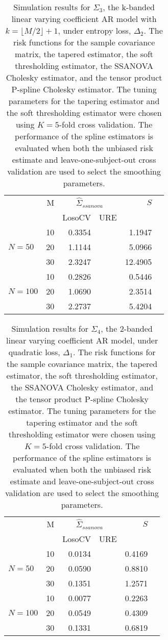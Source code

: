 \documentclass[12pt]{article}
\theoremstyle{definition}
\begin{document}
\begin{table}[ht]
\centering
\caption{Simulation results for $\Sigma_3$, the k-banded linear varying coefficient AR model with $k = \lfloor M/2\rfloor + 1$, under entropy loss, $\Delta_2$. The risk functions for the sample covariance matrix, the tapered estimator, the soft thresholding estimator, the SSANOVA Cholesky estimator, and the tensor product P-spline Cholesky estimator. The tuning parameters for the tapering estimator and the soft thresholding estimator were chosen using $K = 5$-fold cross validation. The performance of the spline estimators is evaluated when both the unbiased risk estimate and leave-one-subject-out cross validation are used to select the smoothing parameters.}
\begin{tabular}{lrrrrr}
& M & \multicolumn{2}{c}{$\hat{\Sigma}_{ssanova}$} & $S$ \\ 
& & \mbox{LosoCV} & \mbox{URE} & \\   \hline
  \hline
&    10 & 0.3354 &&  1.1947 \\ 
$N = 50$ &    20 & 1.1144 &&  5.0966 \\ 
  &    30 & 2.3247 & &  12.4905 \\ 
   \hdashline
    &    10 & 0.2826 & & 0.5446 \\ 
  $N = 100$ &    20 & 1.0690 & & 2.3514 \\ 
   &    30 & 2.2737 & & 5.4204 \\ 
\end{tabular}
\end{table}


\begin{table}[ht]
\centering
\caption{Simulation results for $\Sigma_4$, the 2-banded linear varying coefficient AR model, under quadratic loss, $\Delta_1$. The risk functions for the sample covariance matrix, the tapered estimator, the soft thresholding estimator, the SSANOVA Cholesky estimator, and the tensor product P-spline Cholesky estimator. The tuning parameters for the tapering estimator and the soft thresholding estimator were chosen using $K = 5$-fold cross validation. The performance of the spline estimators is evaluated when both the unbiased risk estimate and leave-one-subject-out cross validation are used to select the smoothing parameters.}
\begin{tabular}{lrrrrr}
& M & \multicolumn{2}{c}{$\hat{\Sigma}_{ssanova}$} & $S$ \\ 
& & \mbox{LosoCV} & \mbox{URE} &  \\   \hline
 &    10 & 0.0134 & & 0.4169 \\ 
$N = 50$ &    20 & 0.0590 & & 0.8810 \\ 
 &    30 & 0.1351 & & 1.2571 \\ \hdashline
     &    10 & 0.0077 & & 0.2263 \\ 
  $N = 100$ &    20 & 0.0549 & & 0.4309 \\ 
   &    30 & 0.1331 & & 0.6819 \\
\end{tabular}
\end{table}
\end{document}
